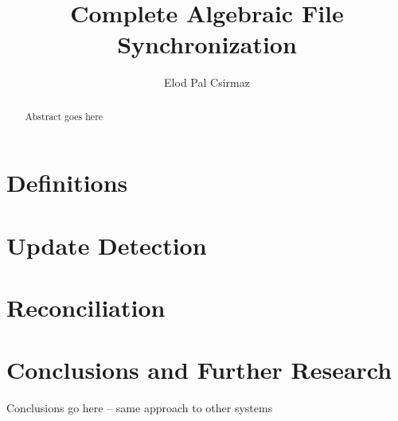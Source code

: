 \documentclass[12pt]{article}
\title{Complete Algebraic File Synchronization}
\author{Elod Pal Csirmaz}
\begin{document}
\maketitle
\begin{abstract}
Abstract goes here
\end{abstract}







\section{Definitions}\label{sec_def}











\section{Update Detection}\label{sec_update}









\section{Reconciliation}\label{sec_rec}



















\section{Conclusions and Further Research}

Conclusions go here -- same approach to other systems
\medskip

\end{document}
